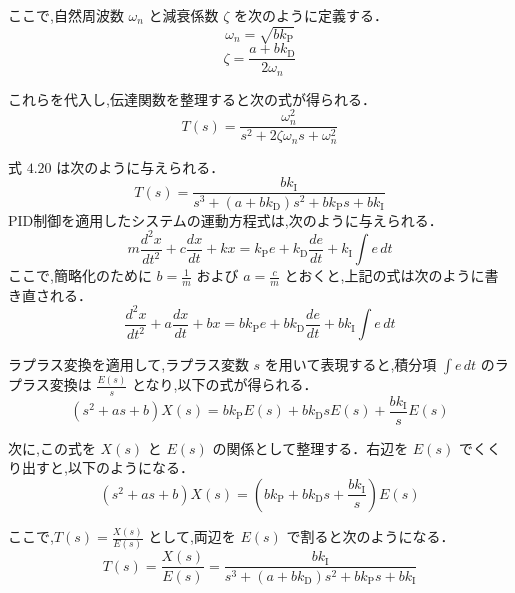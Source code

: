 ここで,自然周波数 \( \omega_n \) と減衰係数 \( \zeta \) を次のように定義する．
\[
  \omega_n = \sqrt{b k_{\mathrm{P}}}
\]
\[
  \zeta = \frac{a + b k_{\mathrm{D}}}{2 \omega_n}
\]

これらを代入し,伝達関数を整理すると次の式が得られる．
\[
  T(s) = \frac{\omega_n^2}{s^2 + 2 \zeta \omega_n s + \omega_n^2}
\]


式 \(4.20\) は次のように与えられる．
\[
  T(s) = \frac{b k_{\mathrm{I}}}{s^3 + (a + b k_{\mathrm{D}})s^2 + b k_{\mathrm{P}} s + b k_{\mathrm{I}}}
\]
PID制御を適用したシステムの運動方程式は,次のように与えられる．
\[
  m \frac{d^2 x}{dt^2} + c \frac{dx}{dt} + kx = k_{\mathrm{P}} e + k_{\mathrm{D}} \frac{de}{dt} + k_{\mathrm{I}} \int e \, dt
\]
ここで,簡略化のために \( b = \frac{1}{m} \) および \( a = \frac{c}{m} \) とおくと,上記の式は次のように書き直される．
\[
  \frac{d^2 x}{dt^2} + a \frac{dx}{dt} + bx = b k_{\mathrm{P}} e + b k_{\mathrm{D}} \frac{de}{dt} + b k_{\mathrm{I}} \int e \, dt
\]

ラプラス変換を適用して,ラプラス変数 \( s \) を用いて表現すると,積分項 \( \int e \, dt \) のラプラス変換は \( \frac{E(s)}{s} \) となり,以下の式が得られる．
\[
  (s^2 + as + b) X(s) = b k_{\mathrm{P}} E(s) + b k_{\mathrm{D}} s E(s) + \frac{b k_{\mathrm{I}}}{s} E(s)
\]

次に,この式を \( X(s) \) と \( E(s) \) の関係として整理する．右辺を \( E(s) \) でくくり出すと,以下のようになる．
\[
  (s^2 + as + b) X(s) = \left( b k_{\mathrm{P}} + b k_{\mathrm{D}} s + \frac{b k_{\mathrm{I}}}{s} \right) E(s)
\]

ここで,\( T(s) = \frac{X(s)}{E(s)} \) として,両辺を \( E(s) \) で割ると次のようになる．
\[
  T(s) = \frac{X(s)}{E(s)} = \frac{b k_{\mathrm{I}}}{s^3 + (a + b k_{\mathrm{D}}) s^2 + b k_{\mathrm{P}} s + b k_{\mathrm{I}}}
\]